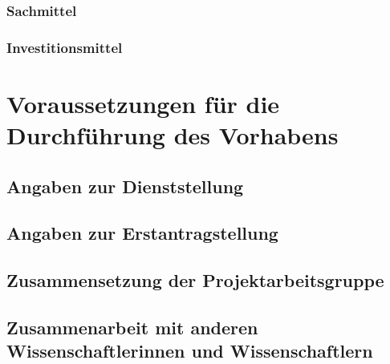 \documentclass{scrartcl}
\begin{document}
\subsubsection{Sachmittel}
\begin{funds}[Sachmittel]








\end{funds}

\subsubsection{Investitionsmittel}




\section{Voraussetzungen für die Durchführung des Vorhabens}

\subsection{Angaben zur Dienststellung}

\subsection{Angaben zur Erstantragstellung}

\subsection{Zusammensetzung der Projektarbeitsgruppe}

\subsection{Zusammenarbeit mit anderen Wissenschaftlerinnen und Wissenschaftlern}
\end{document}
